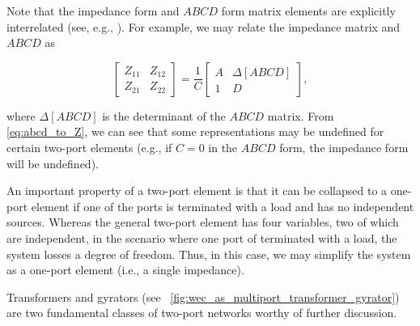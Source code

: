 \documentclass[lettersize,journal]{IEEEtran}
\begin{document}
\noindent{}Note that the impedance form and $ABCD$ form matrix elements are explicitly interrelated (see, e.g., \cite{Frickey:1994aa}).
For example, we may relate the impedance matrix and $ABCD$ as

\begin{equation}
        \begin{bmatrix}
                Z_{11} & Z_{12} \\ Z_{21} & Z_{22}
        \end{bmatrix}
        =
        \frac{1}{C}
        \begin{bmatrix}
                A & \Delta\left[ ABCD \right] \\ 1 & D
        \end{bmatrix} ,
\label{eq:abcd_to_Z}
\end{equation}

\noindent{}where $\Delta\left[ ABCD \right]$ is the determinant of the $ABCD$ matrix.
From \eqref{eq:abcd_to_Z}, we can see that some representations may be undefined for certain two-port elements (e.g., if $C=0$ in the $ABCD$ form, the impedance form will be undefined).

An important property of a two-port element is that it can be collapsed to a one-port element if one of the ports is terminated with a load and has no independent sources.
Whereas the general two-port element has four variables, two of which are independent, in the scenario where one port of terminated with a load, the system losses a degree of freedom.
Thus, in this case, we may simplify the system as a one-port element (i.e., a single impedance).

Transformers and gyrators (see \figurename~\ref{fig:wec_as_multiport_transformer_gyrator}) are two fundamental classes of two-port networks worthy of further discussion.
\end{document}
